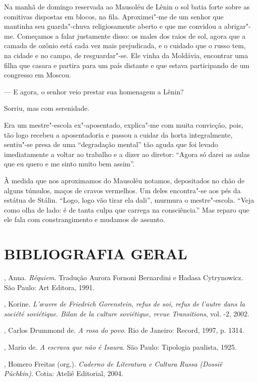 Na manhã de domingo reservada ao Mausoléu de Lênin o sol batia forte sobre as comitivas dispostas em blocos, na fila. Aproximei"-me de um senhor que mantinha seu guarda"-chuva religiosamente aberto e que me convidou a abrigar"-me. Começamos a falar justamente disso: os males dos raios de sol, agora que a camada de ozônio está cada vez mais prejudicada, e o cuidado que o russo tem, na cidade e no campo, de resguardar"-se. Ele vinha da Moldávia, encontrar uma filha que casara e partira para um país distante e que estava participando de um congresso em Moscou.

--- E agora, o senhor veio prestar sua homenagem a Lênin?

Sorriu, mas com serenidade.

Era um mestre"-escola ex"-aposentado, explica"-me com muita convicção, pois, tão logo recebeu a aposentadoria e passou a cuidar da horta integralmente, sentiu"-se presa de uma ``degradação mental'' tão aguda que foi levado imediatamente a voltar ao trabalho e a dizer ao diretor: ``Agora só darei as aulas que eu quero e me sinto muito bem assim''.

À medida que nos aproximamos do Mausoléu notamos, depositados no chão de alguns túmulos, maços de cravos vermelhos. Um deles encontra"-se aos pés da estátua de Stálin. ``Logo, logo vão tirar ela dali'', murmura o mestre"-escola. ``Veja como olha de lado: é de tanta culpa que carrega na consciência.'' Mas reparo que ele fala com constrangimento e mudamos de assunto.

\pagebreak

\section{\uppercase{BIBLIOGRAFIA GERAL}}

, Anna. \emph{Réquiem}. Tradução Aurora Fornoni Bernardini e Hadasa Cytrynowicz. São Paulo: Art Editora, 1991.

, Korine. \emph{L’œuvre de Friedrich Gorenstein, refus de soi, refus de l'autre dans la société
 soviétique. Bilan de la culture soviétique, revue Transitions}, vol. -2, 2002.

, Carlos Drummond de. \emph{A rosa do povo}. Rio de Janeiro:
Record, 1997, p. 13­14.

, Mario de. \emph{A escrava que não é Isaura}. São Paulo: Tipologia paulista, 1925.

, Homero Freitas (org.). \emph{Caderno de Literatura e Cultura
Russa (Dossiê Púchkin)}. Cotia: Ateliê Editorial, 2004.

